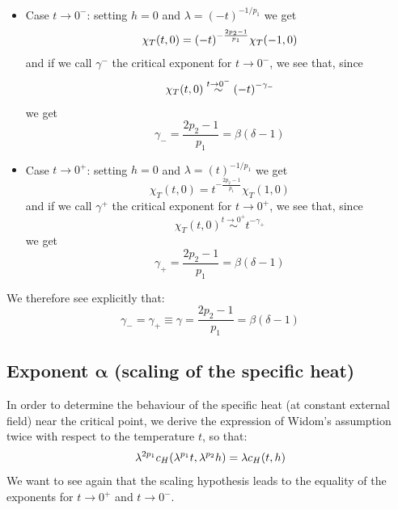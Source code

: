 \documentclass[../../Main/Main.tex]{subfiles}
\begin{document}
\begin{itemize}
\item Case \( t \rightarrow 0^- \): setting \( h=0 \)  and \( \lambda = (-t)^{-1/p_1} \) we get
\begin{equation*}
  \chi _T (t,0) = \qty(-t)^{-\frac{2p_2-1}{p_1}} \chi _T (-1,0)
\end{equation*}
and if we call \( \gamma ^-  \)  the critical exponent for \( t \rightarrow 0^- \), we see that, since
\begin{equation*}
  \chi _T (t,0) \overset{t \rightarrow 0^-}{\sim } \qty(-t)^{-\gamma_-  }
\end{equation*}
we get
\begin{equation*}
  \gamma _- = \frac{2p_2 -1}{p_1} = \beta (\delta -1)
\end{equation*}

\item Case \( t \rightarrow 0^+ \): setting \( h=0 \)  and \( \lambda = (t)^{-1/p_1} \) we get
\begin{equation*}
  \chi _T (t,0) = t^{-\frac{2p_2-1}{p_1}} \chi _T (1,0)
\end{equation*}
and if we call \( \gamma ^+  \)  the critical exponent for \( t \rightarrow 0^+ \), we see that, since
\begin{equation*}
  \chi _T (t,0) \overset{t \rightarrow 0^+}{\sim } t^{-\gamma_+  }
\end{equation*}
we get
\begin{equation*}
  \gamma _+ = \frac{2p_2 -1}{p_1} = \beta (\delta -1)
\end{equation*}
\end{itemize}
We therefore see explicitly that:
\begin{equation}
  \gamma _- = \gamma _+ \equiv \gamma  = \frac{2p_2 -1}{p_1} = \beta (\delta -1)
\end{equation}





\subsection{Exponent \( \pmb{\alpha } \) (scaling of the specific heat)}
In order to determine the behaviour of the specific heat (at constant external field) near the critical point, we derive the expression of Widom's assumption twice with respect to the temperature \( t \), so that:
\begin{equation*}
  \lambda ^{2p_1}c_H \qty(\lambda ^{p_1}t, \lambda ^{p_2}h) = \lambda c_H (t,h)
\end{equation*}
We want to see again that the scaling hypothesis leads to the equality of the exponents for \( t \rightarrow 0^+ \)  and \( t \rightarrow 0^- \).
\end{document}

